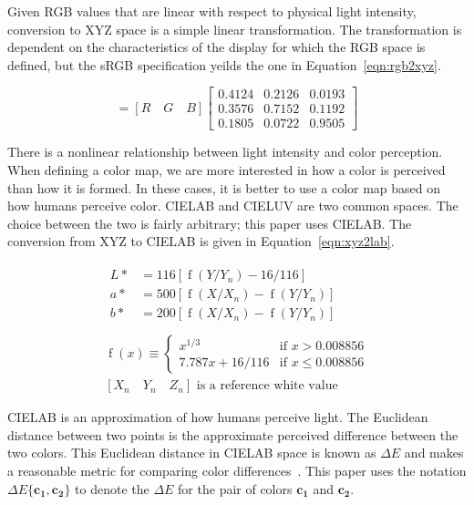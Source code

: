 \documentclass[review,journal]{vgtc}         %
\newcommand{\lcite}[1]{~\cite{#1}}
\newcommand{\RGB}{RGB\xspace}
\newcommand{\XYZ}{XYZ\xspace}
\newcommand{\Lab}{CIELAB\xspace}
\newcommand{\Luv}{CIELUV\xspace}
\newcommand{\DeltaE}{\ensuremath{\Delta{}E}\xspace}
\newcommand*{\cvec}[1]{\mathbf{#1}}
\begin{document}
Given \RGB values that are linear with respect to physical light intensity,
conversion to \XYZ space is a simple linear transformation.  The
transformation is dependent on the characteristics of the display for which
the \RGB space is defined, but the sRGB specification yeilds the one in
Equation~\ref{eqn:rgb2xyz}.

\begin{equation}
  [X \quad Y \quad Z] = [R \quad G \quad B]
  \begin{bmatrix}
    0.4124 & 0.2126 & 0.0193 \\
    0.3576 & 0.7152 & 0.1192 \\
    0.1805 & 0.0722 & 0.9505
  \end{bmatrix}
  \label{eqn:rgb2xyz}
\end{equation}

There is a nonlinear relationship between light intensity and color
perception.  When defining a color map, we are more
interested in how a color is perceived than how it is formed.  In these
cases, it is better to use a color map based on how humans perceive color.
\Lab and \Luv are two common spaces.  The choice between the two is fairly
arbitrary; this paper uses \Lab.  The conversion from \XYZ to \Lab is given
in Equation~\ref{eqn:xyz2lab}.

\begin{equation}
  \begin{gathered}
    \begin{aligned}
      L* &= 116 \left[ \operatorname{f}(Y/Y_n) - 16/116 \right] \\
      a* &=
        500 \left[ \operatorname{f}(X/X_n) - \operatorname{f}(Y/Y_n) \right] \\
      b* &=
        200 \left[ \operatorname{f}(X/X_n) - \operatorname{f}(Y/Y_n) \right] \\
    \end{aligned} \\
    \operatorname{f}(x) \equiv
    \begin{cases}
      x^{1/3}          & \text{if $x > 0.008856$} \\
      7.787 x + 16/116 & \text{if $x \leq 0.008856$}
    \end{cases} \\
    [X_n \quad Y_n \quad Z_n] \text{ is a reference white value}
  \end{gathered}
  \label{eqn:xyz2lab}
\end{equation}

\Lab is an approximation of how humans perceive light.  The Euclidean
distance between two points is the approximate perceived difference between
the two colors.  This Euclidean distance in \Lab space is known as \DeltaE
and makes a reasonable metric for comparing color differences\lcite{Wyszecki82}.
This paper uses the notation $\DeltaE\{\cvec{c_1},\cvec{c_2}\}$ to denote
the \DeltaE for the pair of colors $\cvec{c_1}$ and $\cvec{c_2}$.
\end{document}
